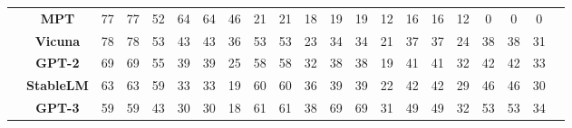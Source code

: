 \begin{table}[H]
{\begin{tabular}{lcccccccccccccccccccc}
&\textbf{MPT} &\cellcolor[HTML]{FAEBEB}77 &\cellcolor[HTML]{FAEBEB}77 &\cellcolor[HTML]{FAEBEB}52 &\cellcolor[HTML]{FAEBEB}64 &\cellcolor[HTML]{FAEBEB}64 &\cellcolor[HTML]{FAEBEB}46 &\cellcolor[HTML]{FAEBEB}21 &\cellcolor[HTML]{FAEBEB}21 &\cellcolor[HTML]{FAEBEB}18 &\cellcolor[HTML]{FAEBEB}19 &\cellcolor[HTML]{FAEBEB}19 &\cellcolor[HTML]{FAEBEB}12 &\cellcolor[HTML]{FAEBEB}16 &\cellcolor[HTML]{FAEBEB}16 &\cellcolor[HTML]{FAEBEB}12 &\cellcolor[HTML]{FAEBEB}0 &\cellcolor[HTML]{FAEBEB}0 &\cellcolor[HTML]{FAEBEB}0 \\
&\textbf{Vicuna} &\cellcolor[HTML]{FAEBEB}78 &\cellcolor[HTML]{FAEBEB}78 &\cellcolor[HTML]{FAEBEB}53 &\cellcolor[HTML]{FAEBEB}43 &\cellcolor[HTML]{FAEBEB}43 &\cellcolor[HTML]{FAEBEB}36 &\cellcolor[HTML]{FAEBEB}53 &\cellcolor[HTML]{FAEBEB}53 &\cellcolor[HTML]{FAEBEB}23 &\cellcolor[HTML]{FAEBEB}34 &\cellcolor[HTML]{FAEBEB}34 &\cellcolor[HTML]{FAEBEB}21 &\cellcolor[HTML]{FAEBEB}37 &\cellcolor[HTML]{FAEBEB}37 &\cellcolor[HTML]{FAEBEB}24 &\cellcolor[HTML]{FAEBEB}38 &\cellcolor[HTML]{FAEBEB}38 &\cellcolor[HTML]{FAEBEB}31 \\
&\textbf{GPT-2} &\cellcolor[HTML]{FAEBEB}69 &\cellcolor[HTML]{FAEBEB}69 &\cellcolor[HTML]{FAEBEB}55 &\cellcolor[HTML]{FAEBEB}39 &\cellcolor[HTML]{FAEBEB}39 &\cellcolor[HTML]{FAEBEB}25 &\cellcolor[HTML]{FAEBEB}58 &\cellcolor[HTML]{FAEBEB}58 &\cellcolor[HTML]{FAEBEB}32 &\cellcolor[HTML]{FAEBEB}38 &\cellcolor[HTML]{FAEBEB}38 &\cellcolor[HTML]{FAEBEB}19 &\cellcolor[HTML]{FAEBEB}41 &\cellcolor[HTML]{FAEBEB}41 &\cellcolor[HTML]{FAEBEB}32 &\cellcolor[HTML]{FAEBEB}42 &\cellcolor[HTML]{FAEBEB}42 &\cellcolor[HTML]{FAEBEB}33 \\
&\textbf{StableLM} &\cellcolor[HTML]{FAEBEB}63 &\cellcolor[HTML]{FAEBEB}63 &\cellcolor[HTML]{FAEBEB}59 &\cellcolor[HTML]{FAEBEB}33 &\cellcolor[HTML]{FAEBEB}33 &\cellcolor[HTML]{FAEBEB}19 &\cellcolor[HTML]{FAEBEB}60 &\cellcolor[HTML]{FAEBEB}60 &\cellcolor[HTML]{FAEBEB}36 &\cellcolor[HTML]{FAEBEB}39 &\cellcolor[HTML]{FAEBEB}39 &\cellcolor[HTML]{FAEBEB}22 &\cellcolor[HTML]{FAEBEB}42 &\cellcolor[HTML]{FAEBEB}42 &\cellcolor[HTML]{FAEBEB}29 &\cellcolor[HTML]{FAEBEB}46 &\cellcolor[HTML]{FAEBEB}46 &\cellcolor[HTML]{FAEBEB}30 \\
&\textbf{GPT-3} &\cellcolor[HTML]{FAEBEB}59 &\cellcolor[HTML]{FAEBEB}59 &\cellcolor[HTML]{FAEBEB}43 &\cellcolor[HTML]{FAEBEB}30 &\cellcolor[HTML]{FAEBEB}30 &\cellcolor[HTML]{FAEBEB}18 &\cellcolor[HTML]{FAEBEB}61 &\cellcolor[HTML]{FAEBEB}61 &\cellcolor[HTML]{FAEBEB}38 &\cellcolor[HTML]{FAEBEB}69 &\cellcolor[HTML]{FAEBEB}69 &\cellcolor[HTML]{FAEBEB}31 &\cellcolor[HTML]{FAEBEB}49 &\cellcolor[HTML]{FAEBEB}49 &\cellcolor[HTML]{FAEBEB}32 &\cellcolor[HTML]{FAEBEB}53 &\cellcolor[HTML]{FAEBEB}53 &\cellcolor[HTML]{FAEBEB}34 \\


\end{tabular}}
\end{table}
